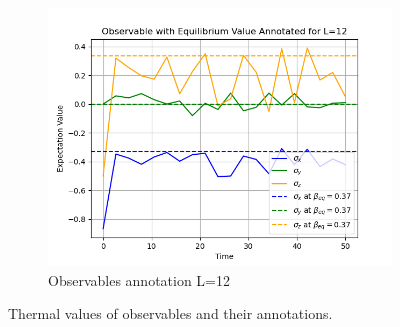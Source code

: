 \documentclass[12pt]{article}
\begin{document}
\begin{figure}[htbp]
\begin{subfigure}[b]{0.32\textwidth}
        \includegraphics[width=\textwidth]{p4_1_2_observables_annotation_L12.png}
        \caption{Observables annotation L=12}
    \end{subfigure}
    
    \caption{Thermal values of observables and their annotations.}
\end{figure}
\end{document}
